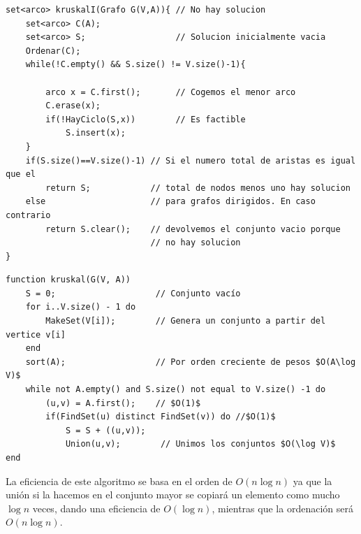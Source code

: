 \documentclass[10pt,a4paper,spanish]{report}
\theoremstyle{definition}
\theoremstyle{remark}
\begin{document}
\begin{verbatim}
set<arco> kruskalI(Grafo G(V,A)){ // No hay solucion
    set<arco> C(A);
    set<arco> S;                  // Solucion inicialmente vacia
    Ordenar(C);
    while(!C.empty() && S.size() != V.size()-1){
        
        arco x = C.first();       // Cogemos el menor arco
        C.erase(x);
        if(!HayCiclo(S,x))        // Es factible
            S.insert(x); 
    }
    if(S.size()==V.size()-1) // Si el numero total de aristas es igual que el 
        return S;            // total de nodos menos uno hay solucion 
    else                     // para grafos dirigidos. En caso contrario
        return S.clear();    // devolvemos el conjunto vacio porque 
                             // no hay solucion
}
\end{verbatim}

\begin{verbatim}
function kruskal(G(V, A))
    S = 0;                    // Conjunto vacío
    for i..V.size() - 1 do
        MakeSet(V[i]);        // Genera un conjunto a partir del vertice v[i]
    end
    sort(A);                  // Por orden creciente de pesos $O(A\log V)$
    while not A.empty() and S.size() not equal to V.size() -1 do
        (u,v) = A.first();    // $O(1)$
        if(FindSet(u) distinct FindSet(v)) do //$O(1)$
            S = S + ((u,v));
            Union(u,v);        // Unimos los conjuntos $O(\log V)$
end
\end{verbatim}

La eficiencia de este algoritmo se basa en el orden de $O(n\log n)$ ya que la unión si la hacemos en el conjunto mayor se copiará un elemento como mucho $\log n$ veces, dando una eficiencia de $O(\log n)$, mientras que la ordenación será $O(n\log n)$.
\end{document}

